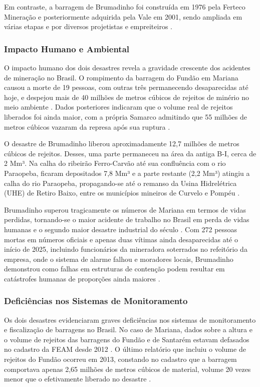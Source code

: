 Em contraste, a barragem de Brumadinho foi construída em 1976 pela Ferteco Mineração e posteriormente adquirida pela Vale em 2001, sendo ampliada em várias etapas e por diversos projetistas e empreiteiros \cite{wikipedia2019brumadinho}.

\subsubsection{Impacto Humano e Ambiental}

O impacto humano dos dois desastres revela a gravidade crescente dos acidentes de mineração no Brasil. O rompimento da barragem do Fundão em Mariana causou a morte de 19 pessoas, com outras três permanecendo desaparecidas até hoje, e despejou mais de 40 milhões de metros cúbicos de rejeitos de minério no meio ambiente \cite{brasil2024timeline}. Dados posteriores indicaram que o volume real de rejeitos liberados foi ainda maior, com a própria Samarco admitindo que 55 milhões de metros cúbicos vazaram da represa após sua ruptura \cite{projetomanuelzao2015}.

O desastre de Brumadinho liberou aproximadamente 12,7 milhões de metros cúbicos de rejeitos. Desses, uma parte permaneceu na área da antiga B-I, cerca de 2 Mm³. Na calha do ribeirão Ferro-Carvão até sua confluência com o rio Paraopeba, ficaram depositados 7,8 Mm³ e a parte restante (2,2 Mm³) atingiu a calha do rio Paraopeba, propagando-se até o remanso da Usina Hidrelétrica (UHE) de Retiro Baixo, entre os municípios mineiros de Curvelo e Pompéu \cite{minasgerais2024historico}.

Brumadinho superou tragicamente os números de Mariana em termos de vidas perdidas, tornando-se o maior acidente de trabalho no Brasil em perda de vidas humanas e o segundo maior desastre industrial do século \cite{wikipedia2019brumadinho}. Com 272 pessoas mortas em números oficiais e apenas duas vítimas ainda desaparecidas até o início de 2025, incluindo funcionários da mineradora soterrados no refeitório da empresa, onde o sistema de alarme falhou e moradores locais, Brumadinho demonstrou como falhas em estruturas de contenção podem resultar em catástrofes humanas de proporções ainda maiores \cite{wikipedia2019brumadinho}.

\subsubsection{Deficiências nos Sistemas de Monitoramento}

Os dois desastres evidenciaram graves deficiências nos sistemas de monitoramento e fiscalização de barragens no Brasil. No caso de Mariana, dados sobre a altura e o volume de rejeitos das barragens do Fundão e de Santarém estavam defasados no cadastro da FEAM desde 2012 \cite{projetomanuelzao2015}. O último relatório que incluiu o volume de rejeitos do Fundão ocorreu em 2013, constando no cadastro que a barragem comportava apenas 2,65 milhões de metros cúbicos de material, volume 20 vezes menor que o efetivamente liberado no desastre \cite{projetomanuelzao2015}.

